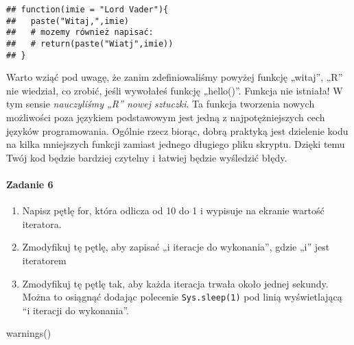 \documentclass[
]{article}
\providecommand{\tightlist}{%
  \setlength{\itemsep}{0pt}\setlength{\parskip}{0pt}}
\begin{document}
\begin{verbatim}
## function(imie = "Lord Vader"){
##   paste("Witaj,",imie)
##   # mozemy również napisać:
##   # return(paste("Wiatj",imie))
## }
\end{verbatim}

Warto wziąć pod uwagę, że zanim zdefiniowaliśmy powyżej funkcję
„witaj'', „R'' nie wiedział, co zrobić, jeśli wywołałeś funkcję
„hello()''. Funkcja nie istniała! W tym sensie \emph{nauczyliśmy „R''
nowej sztuczki}. Ta funkcja tworzenia nowych możliwości poza językiem
podstawowym jest jedną z najpotężniejszych cech języków programowania.
Ogólnie rzecz biorąc, dobrą praktyką jest dzielenie kodu na kilka
mniejszych funkcji zamiast jednego długiego pliku skryptu. Dzięki temu
Twój kod będzie bardziej czytelny i łatwiej będzie wyśledzić błędy.

\hypertarget{zadanie-6}{%
\paragraph{Zadanie 6}\label{zadanie-6}}

\begin{enumerate}
\def\labelenumi{\arabic{enumi}.}
\tightlist
\item
  Napisz pętlę for, która odlicza od 10 do 1 i wypisuje na ekranie
  wartość iteratora.
\item
  Zmodyfikuj tę pętlę, aby zapisać „i iteracje do wykonania'', gdzie
  „i'' jest iteratorem
\item
  Zmodyfikuj tę pętlę tak, aby każda iteracja trwała około jednej
  sekundy. Można to osiągnąć dodając polecenie \texttt{Sys.sleep(1)} pod
  linią wyświetlającą ``i iteracji do wykonania''.
\end{enumerate}

warnings()
\end{document}
